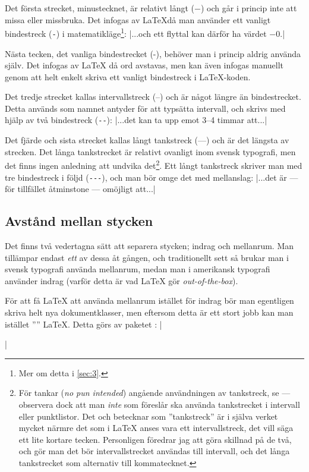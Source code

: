 \documentclass[10pt,../../a4.tex]{subfiles}
\begin{document}
Det första strecket, minustecknet, är relativt långt (\(-\)) och går i
princip inte att missa eller missbruka. Det infogas av \LaTeX då man
använder ett vanligt bindestreck (\verb|-|) i matematikläge\footnote{
Mer om detta i \cref{sec:3}.}:
\latex|...och ett flyttal kan därför ha värdet \(-0\).|

Nästa tecken, det vanliga bindestrecket (-), behöver man i princip aldrig
använda själv. Det infogas av \LaTeX{} då ord avstavas, men kan även
infogas manuellt genom att helt enkelt skriva ett vanligt bindestreck
i \LaTeX{}-koden.

Det tredje strecket kallas intervallstreck (–) och är något längre än
bindestrecket. Detta används som namnet antyder för att typsätta
intervall, och skrivs med hjälp av två bindestreck (\verb|--|):
\latex|...det kan ta upp emot 3--4 timmar att...|

Det fjärde och sista strecket kallas långt tankstreck (—) och är det längsta av
strecken. Det långa tankstrecket är relativt ovanligt inom svensk typografi, men det
finns ingen anledning att undvika det\footnote{För tankar (\emph{no pun
intended}) angående användningen av tankstreck, se 
\textcite[\ppno~46–47]{LIU98} — observera dock att man \emph{inte} som 
\citeauthor*{LIU98} föreslår ska använda tankstrecket i intervall eller
punktlistor. Det \textcite{Sprakradet08} och \citeauthor*{LIU98} betecknar som
”tankstreck” är i själva verket mycket närmre det som i \LaTeX{} anses vara ett
intervallstreck, det vill säga ett lite kortare tecken. Personligen föredrar jag 
att göra skillnad på de två, och gör man det bör intervallstrecket användas till
intervall, och det långa tankstrecket som alternativ till kommatecknet.}.
Ett långt tankstreck skriver man med tre bindestreck i följd
(\verb|---|), och man bör omge det med mellanslag:
\latex|...det är --- för tillfället åtminstone --- omöjligt att...|

\subsection{Avstånd mellan stycken}
Det finns två vedertagna sätt att separera stycken; indrag och
mellanrum. Man tillämpar endast \emph{ett} av dessa åt gången, och
traditionellt sett så brukar man i svensk typografi använda mellanrum,
medan man i amerikansk typografi använder indrag (varför detta är vad
\LaTeX{} gör \emph{out-of-the-box}).

För att få \LaTeX{} att använda mellanrum istället för indrag bör man
egentligen skriva helt nya dokumentklasser, men eftersom detta är ett
stort jobb kan man istället ”” \LaTeX{}. Detta görs av
paketet :
\latex|\usepackage{parskip}|
\end{document}
